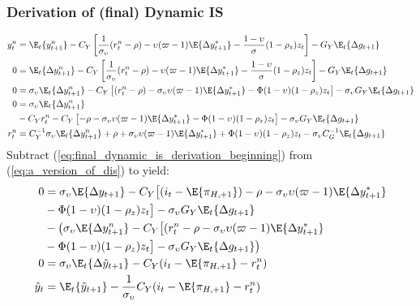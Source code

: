 \subsubsection*{Derivation of (final) Dynamic IS}
\begin{align}\label{eq:final_dynamic_is_derivation_beginning}
    y^n_t  &= \E_t \{y^n_{t+1}\} - C_Y\left[\frac{1}{\sigma_\upsilon}(r^n_t - \rho) - \upsilon (\varpi - 1)\E \{\Delta y_{t+1}^* \}  - \frac{1-\upsilon}{\sigma} (1-\rho_z)z_t\right] - G_Y \E_t \{ \Delta g_{t+1} \}\\
    0  &= \E_t \{\Delta y^n_{t+1}\} - C_Y\left[\frac{1}{\sigma_\upsilon}(r^n_t - \rho) - \upsilon (\varpi - 1)\E \{\Delta y_{t+1}^* \}  - \frac{1-\upsilon}{\sigma} (1-\rho_z)z_t\right] - G_Y \E_t \{ \Delta g_{t+1} \}\\
    0  &= \sigma_\upsilon \E_t \{\Delta y^n_{t+1}\} - C_Y\left[(r^n_t - \rho) - \sigma_\upsilon \upsilon (\varpi - 1)\E \{\Delta y_{t+1}^* \}  - \Phi (1-\upsilon)(1-\rho_z)z_t\right] - \sigma_\upsilon G_Y \E_t \{ \Delta g_{t+1} \}\\
    0  &= \sigma_\upsilon \E_t \{\Delta y^n_{t+1}\} \nonumber \\ 
        &- C_Y r^n_t - C_Y\left[-\rho - \sigma_\upsilon \upsilon (\varpi - 1)\E \{\Delta y_{t+1}^* \}  - \Phi (1-\upsilon)(1-\rho_z)z_t\right] - \sigma_\upsilon G_Y \E_t \{ \Delta g_{t+1} \}\\
    r^n_t  &= C_Y^{-1}\sigma_\upsilon \E_t \{\Delta y^n_{t+1}\} + \rho + \sigma_\upsilon \upsilon (\varpi - 1)\E \{\Delta y_{t+1}^* \}  + \Phi (1-\upsilon)(1-\rho_z)z_t - \sigma_\upsilon C_G^{-1}\E_t \{ \Delta g_{t+1} \} \label{eq:appendix_natural_rate_of_interest_dynamic_is}
\end{align}
Subtract (\ref{eq:final_dynamic_is_derivation_beginning}) from (\ref{eq:a_version_of_dis}) to yield:
\begin{align}
    0 &= \sigma_\upsilon \E \{\Delta y_{t+1} \} - C_Y\big[(i_t - \E \{ \pi_{H,+1}\}) - \rho - \sigma_\upsilon \upsilon (\varpi - 1)\E \{\Delta y_{t+1}^* \} \nonumber \\ 
    &- \Phi(1-\upsilon) (1-\rho_z)z_t \big] - \sigma_\upsilon G_Y \E_t \{ \Delta g_{t+1} \} \nonumber \\
    &- \big(\sigma_\upsilon \E \{\Delta y_{t+1}^n \} - C_Y\big[(r^n_t - \rho - \sigma_\upsilon \upsilon (\varpi - 1)\E \{\Delta y_{t+1}^* \} \nonumber \\ 
    &- \Phi(1-\upsilon) (1-\rho_z)z_t \big] - \sigma_\upsilon G_Y \E_t \{ \Delta g_{t+1} \} \big) \\
    0 &= \sigma_\upsilon \E_t \{\Delta \tilde{y}_{t+1} \} - C_Y(i_t - \E \{ \pi_{H,+1}\} - r^n_t)\\
    \tilde{y}_t &= \E_t\{\tilde{y}_{t+1}\} - \frac{1}{\sigma_\upsilon}C_Y(i_t - \E \{ \pi_{H,+1}\} - r^n_t) \label{eq:final_dynamic_is_derivation_end}
\end{align}